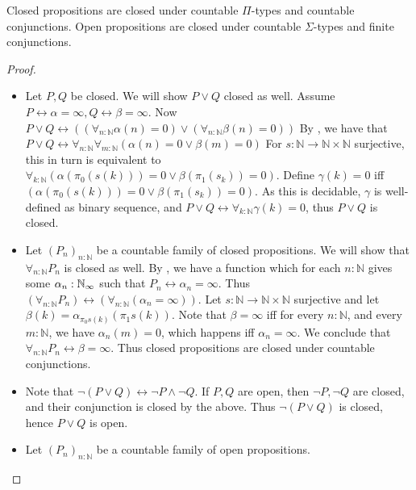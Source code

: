 \documentclass{../util/zariski-small}
\begin{document}
\begin{lemma}\label{lemOpenClosedDisjunctionConjunction}
  Closed propositions are closed under countable $\Pi$-types and countable conjunctions.
  Open propositions are closed under countable $\Sigma$-types and finite conjunctions. 
\end{lemma}
\begin{proof}
  \begin{itemize}
    \item Let $P,Q$ be closed. We will show $P\vee Q$ closed as well. 
      Assume $P\leftrightarrow \alpha = \infty, Q \leftrightarrow \beta = \infty$. 
      Now $P\vee Q \leftrightarrow ((\forall_{n:\mathbb N} \alpha(n) = 0) \vee (\forall_{n:\mathbb N} \beta(n) = 0))$
      By , we have that 
      $P\vee Q \leftrightarrow \forall_{n:\mathbb N}  \forall_{m:\mathbb N}  (\alpha(n) = 0 \vee \beta(m) = 0)$
      For $s:\mathbb N \to \mathbb N \times \mathbb N$ surjective, this in turn is equivalent to 
      $\forall_{k:\mathbb N}  (\alpha(\pi_0(s(k))) = 0 \vee \beta(\pi_1(s_k)) = 0)$. 
      Define $\gamma(k) = 0$ iff $(\alpha(\pi_0(s(k))) = 0 \vee \beta(\pi_1(s_k)) = 0)$. 
      As this is decidable, $\gamma$ is well-defined as binary sequence, and 
      $P\vee Q \leftrightarrow \forall_{k:\mathbb N} \gamma(k) = 0$, thus $P\vee Q$ is closed. 
    \item Let $(P_n)_{n:\mathbb N}$ be a countable family of closed propositions. We will show that 
      $\forall_{n:\mathbb N} P_n$ is closed as well. 
      By , we have a function which for each $n:\mathbb N$ gives some $\alpha_n:\mathbb{N}_{\infty}$ 
      such that $P_n \leftrightarrow \alpha_n =\infty$. 
      Thus $(\forall_{n:\mathbb N} P_n )\leftrightarrow (\forall_{n:\mathbb N}(\alpha_n = \infty))$. 
      Let $s:\mathbb N \to \mathbb N \times \mathbb N$ surjective and let 
      $\beta(k) = \alpha_{\pi_0s(k)}(\pi_1 s(k))$. 
      Note that $\beta = \infty$ iff for every $n:\mathbb N$, and every $m:\mathbb N$, we have $\alpha_n(m) = 0$, 
      which happens iff $\alpha_n = \infty$. 
      We conclude that $\forall_{n:\mathbb N} P_n \leftrightarrow \beta = \infty$.
      Thus closed propositions are closed under countable conjunctions. 
    \item 
      Note that $\neg (P \vee Q) \leftrightarrow \neg P \wedge \neg Q$. 
      If $P,Q$ are open, then $\neg P, \neg Q$ are closed, and their conjunction is closed by the above. 
      Thus $\neg (P\vee Q)$ is closed, hence $P\vee Q$ is open. 
    \item Let $(P_n)_{n:\mathbb N}$ be a countable family of open propositions. 

\end{itemize}
\end{proof}
\end{document}

